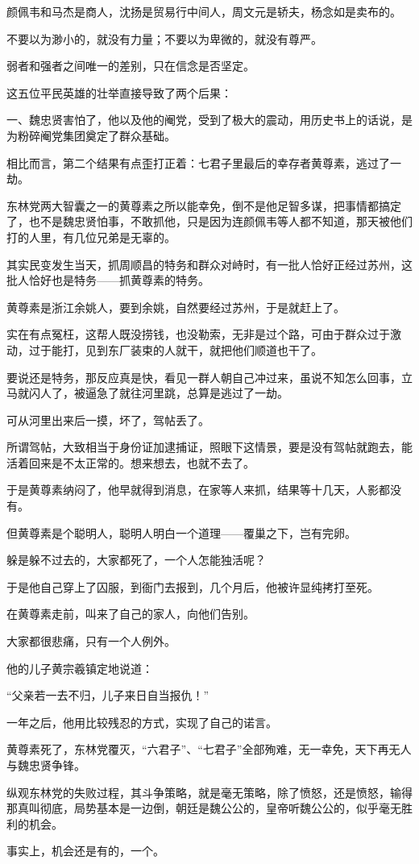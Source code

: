\begin{multicols}{\theparacolNo}
		颜佩韦和马杰是商人，沈扬是贸易行中间人，周文元是轿夫，杨念如是卖布的。

		不要以为渺小的，就没有力量；不要以为卑微的，就没有尊严。

		弱者和强者之间唯一的差别，只在信念是否坚定。

		这五位平民英雄的壮举直接导致了两个后果：

		一、魏忠贤害怕了，他以及他的阉党，受到了极大的震动，用历史书上的话说，是为粉碎阉党集团奠定了群众基础。

		相比而言，第二个结果有点歪打正着：七君子里最后的幸存者黄尊素，逃过了一劫。

		东林党两大智囊之一的黄尊素之所以能幸免，倒不是他足智多谋，把事情都搞定了，也不是魏忠贤怕事，不敢抓他，只是因为连颜佩韦等人都不知道，那天被他们打的人里，有几位兄弟是无辜的。

		其实民变发生当天，抓周顺昌的特务和群众对峙时，有一批人恰好正经过苏州，这批人恰好也是特务——抓黄尊素的特务。

		黄尊素是浙江余姚人，要到余姚，自然要经过苏州，于是就赶上了。

		实在有点冤枉，这帮人既没捞钱，也没勒索，无非是过个路，可由于群众过于激动，过于能打，见到东厂装束的人就干，就把他们顺道也干了。

		要说还是特务，那反应真是快，看见一群人朝自己冲过来，虽说不知怎么回事，立马就闪人了，被逼急了就往河里跳，总算是逃过了一劫。

		可从河里出来后一摸，坏了，驾帖丢了。

		所谓驾帖，大致相当于身份证加逮捕证，照眼下这情景，要是没有驾帖就跑去，能活着回来是不太正常的。想来想去，也就不去了。

		于是黄尊素纳闷了，他早就得到消息，在家等人来抓，结果等十几天，人影都没有。

		但黄尊素是个聪明人，聪明人明白一个道理——覆巢之下，岂有完卵。

		躲是躲不过去的，大家都死了，一个人怎能独活呢？

		于是他自己穿上了囚服，到衙门去报到，几个月后，他被许显纯拷打至死。

		在黄尊素走前，叫来了自己的家人，向他们告别。

		大家都很悲痛，只有一个人例外。

		他的儿子黄宗羲镇定地说道：

		“父亲若一去不归，儿子来日自当报仇！”

		一年之后，他用比较残忍的方式，实现了自己的诺言。

		黄尊素死了，东林党覆灭，“六君子”、“七君子”全部殉难，无一幸免，天下再无人与魏忠贤争锋。

		纵观东林党的失败过程，其斗争策略，就是毫无策略，除了愤怒，还是愤怒，输得那真叫彻底，局势基本是一边倒，朝廷是魏公公的，皇帝听魏公公的，似乎毫无胜利的机会。

		事实上，机会还是有的，一个。
		\ifnum{}
	\end{multicols}
\fi
\newpage
